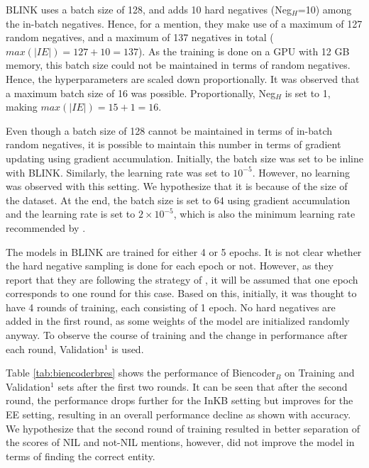\documentclass{report}
\theoremstyle{definition}
\theoremstyle{remark}
\begin{document}
BLINK uses a batch size of 128, and adds 10 hard negatives (Neg$_H$=10) among the in-batch negatives. Hence, for a mention, they make use of a maximum of 127 random negatives, and a maximum of 137 negatives in total ($max(|IE|)=127+10=137$). As the training is done on a GPU with 12 GB memory, this batch size could not be maintained in terms of random negatives. Hence, the hyperparameters are scaled down proportionally. It was observed that a maximum batch size of 16 was possible. Proportionally, Neg$_H$ is set to 1, making $max(|IE|)=15+1=16$.

Even though a batch size of 128 cannot be maintained in terms of in-batch random negatives, it is possible to maintain this number in terms of gradient updating using gradient accumulation. Initially, the batch size was set to be inline with BLINK. Similarly, the learning rate was set to $10^{-5}$. However, no learning was observed with this setting. We hypothesize that it is because of the size of the dataset. At the end, the batch size is set to 64 using gradient accumulation and the learning rate is set to $2 \times 10^{-5}$, which is also the minimum learning rate recommended by \cite{BERT}.

The models in BLINK are trained for either 4 or 5 epochs. It is not clear whether the hard negative sampling is done for each epoch or not. However, as they report that they are following the strategy of \cite{googleintern}, it will be assumed that one epoch corresponds to one round for this case. Based on this, initially, it was thought to have 4 rounds of training, each consisting of 1 epoch. No hard negatives are added in the first round, as some weights of the model are initialized randomly anyway. To observe the course of training and the change in performance after each round, Validation$^1$ is used.

Table \ref{tab:biencoderbres} shows the performance of Biencoder$_B$ on Training and Validation$^1$ sets after the first two rounds. It can be seen that after the second round, the performance drops further for the InKB setting but improves for the EE setting, resulting in an overall performance decline as shown with accuracy. We hypothesize that the second round of training resulted in better separation of the scores of NIL and not-NIL mentions, however, did not improve the model in terms of finding the correct entity. 
\end{document}
